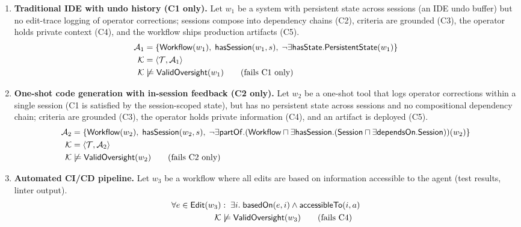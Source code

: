 \documentclass[11pt]{article}
\newcommand{\TBox}{\ensuremath{\mathcal{T}}\xspace}
\newcommand{\ABox}{\ensuremath{\mathcal{A}}\xspace}
\newcommand{\KB}{\ensuremath{\mathcal{K}}\xspace}
\begin{document}
\begin{enumerate}[label=(\alph*),leftmargin=2em]

\item \textbf{Traditional IDE with undo history (C1 only).}
Let $w_1$ be a system with persistent state across sessions (an IDE undo buffer) but no edit-trace logging of operator corrections; sessions compose into dependency chains (C2), criteria are grounded (C3), the operator holds private context (C4), and the workflow ships production artifacts (C5).
\begin{align}
  \ABox_1 &= \{ \mathsf{Workflow}(w_1),\; \mathsf{hasSession}(w_1, s),\;
               \neg\exists\mathsf{hasState}.\mathsf{PersistentState}(w_1) \} \notag \\
  \KB &= \langle \TBox, \ABox_1 \rangle \notag \\
  \KB &\not\models \mathsf{ValidOversight}(w_1) \qquad \text{(fails C1 only)}
\end{align}

\item \textbf{One-shot code generation with in-session feedback (C2 only).}
Let $w_2$ be a one-shot tool that logs operator corrections within a single session (C1 is satisfied by the session-scoped state), but has no persistent state across sessions and no compositional dependency chain; criteria are grounded (C3), the operator holds private information (C4), and an artifact is deployed (C5).
\begin{align}
  \ABox_2 &= \{ \mathsf{Workflow}(w_2),\; \mathsf{hasSession}(w_2, s),\;
               \neg\exists\mathsf{partOf}.({\mathsf{Workflow} \sqcap \exists\mathsf{hasSession}.(\mathsf{Session} \sqcap \exists\mathsf{dependsOn}.\mathsf{Session})})(w_2) \} \notag \\
  \KB &= \langle \TBox, \ABox_2 \rangle \notag \\
  \KB &\not\models \mathsf{ValidOversight}(w_2) \qquad \text{(fails C2 only)}
\end{align}

\item \textbf{Automated CI/CD pipeline.}
Let $w_3$ be a workflow where all edits are based on information accessible to the agent (test results, linter output).
\begin{align}
  \forall e \in \mathsf{Edit}(w_3)&: \; \exists i.\; \mathsf{basedOn}(e, i) \wedge \mathsf{accessibleTo}(i, a) \notag \\
  \KB &\not\models \mathsf{ValidOversight}(w_3) \qquad \text{(fails C4)}
\end{align}


\end{enumerate}
\end{document}
